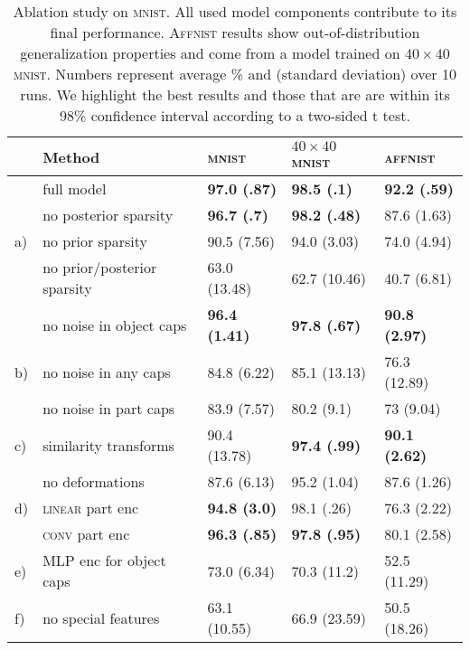 \begin{table}
\centering
\begin{minipage}[c]{.24\linewidth}
    \caption{
        Ablation study on \textsc{mnist}. All used model components contribute to its final performance. \textsc{Affnist} results show out-of-distribution generalization properties and come from a model trained on $40\times40$ \textsc{mnist}. Numbers represent average \% and (standard deviation) over 10 runs. We highlight the best results and those that are are within its 98\% confidence interval according to a two-sided t test.
    }
    \label{tab:ablation}
\end{minipage}
\hfill
\begin{minipage}[c]{.75\linewidth}
    \small
    \begin{tabular}{@{}lllll@{}}
        & Method & \textsc{mnist} & $40\times40$ \textsc{mnist} & \textsc{affnist} \\
        \midrule
        &full model & \textbf{97.0 (.87)} & \textbf{98.5 (.1)} & \textbf{92.2 (.59)} \\
        \midrule
        & no posterior sparsity  & \textbf{96.7	(.7)} & \textbf{98.2	(.48)} & 87.6	(1.63) \\
        a)& no prior sparsity  & 90.5 (7.56) & 94.0	(3.03) & 74.0	(4.94) \\
        & no prior/posterior sparsity  &	63.0	(13.48) &	62.7	(10.46) & 40.7 (6.81)\\
        \midrule
        & no noise in object caps &	\textbf{96.4	(1.41)} &	\textbf{97.8	(.67)} &	\textbf{90.8	(2.97)}\\
        b)& no noise in any caps &	84.8	(6.22) &	85.1	(13.13) &	76.3	(12.89)\\
        &no noise in part caps	& 83.9	(7.57) &	80.2	(9.1) &	73	(9.04)\\
        \midrule
        c)& similarity transforms &	90.4	(13.78) &	\textbf{97.4	(.99)} &	\textbf{90.1	(2.62)}\\
        &no deformations	& 87.6	(6.13) &	95.2	(1.04) &	87.6	(1.26)\\
        \midrule
        d)&\textsc{linear} part enc & \textbf{94.8	(3.0)} &	98.1	(.26)	& 76.3	(2.22)\\
        &\textsc{conv} part enc &	\textbf{96.3	(.85)} &	\textbf{97.8	(.95)} &	80.1	(2.58)\\
        \midrule
        e)& \gls{MLP} enc for object caps	& 73.0	(6.34) &	70.3	(11.2) &	52.5	(11.29)\\
        f)& no special features &	63.1	(10.55) &	66.9	(23.59) &	50.5	(18.26)\\
    \end{tabular}
\end{minipage}
\vspace*{-1em}
\end{table}
